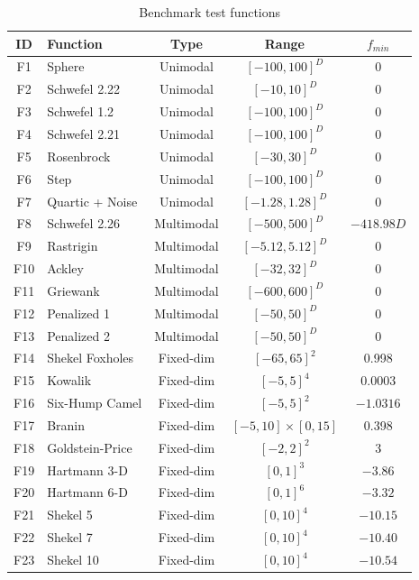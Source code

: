 \documentclass[preprint,12pt]{elsarticle}
\begin{document}
\begin{table}[htbp]
\centering
\caption{Benchmark test functions}
\label{tab:benchmarks}
\footnotesize
\begin{tabular}{clccc}
\toprule
\textbf{ID} & \textbf{Function} & \textbf{Type} & \textbf{Range} & \textbf{$f_{min}$} \\
\midrule
F1 & Sphere & Unimodal & $[-100, 100]^D$ & 0 \\
F2 & Schwefel 2.22 & Unimodal & $[-10, 10]^D$ & 0 \\
F3 & Schwefel 1.2 & Unimodal & $[-100, 100]^D$ & 0 \\
F4 & Schwefel 2.21 & Unimodal & $[-100, 100]^D$ & 0 \\
F5 & Rosenbrock & Unimodal & $[-30, 30]^D$ & 0 \\
F6 & Step & Unimodal & $[-100, 100]^D$ & 0 \\
F7 & Quartic + Noise & Unimodal & $[-1.28, 1.28]^D$ & 0 \\
\midrule
F8 & Schwefel 2.26 & Multimodal & $[-500, 500]^D$ & $-418.98D$ \\
F9 & Rastrigin & Multimodal & $[-5.12, 5.12]^D$ & 0 \\
F10 & Ackley & Multimodal & $[-32, 32]^D$ & 0 \\
F11 & Griewank & Multimodal & $[-600, 600]^D$ & 0 \\
F12 & Penalized 1 & Multimodal & $[-50, 50]^D$ & 0 \\
F13 & Penalized 2 & Multimodal & $[-50, 50]^D$ & 0 \\
\midrule
F14 & Shekel Foxholes & Fixed-dim & $[-65, 65]^2$ & 0.998 \\
F15 & Kowalik & Fixed-dim & $[-5, 5]^4$ & 0.0003 \\
F16 & Six-Hump Camel & Fixed-dim & $[-5, 5]^2$ & $-1.0316$ \\
F17 & Branin & Fixed-dim & $[-5, 10] \times [0, 15]$ & 0.398 \\
F18 & Goldstein-Price & Fixed-dim & $[-2, 2]^2$ & 3 \\
F19 & Hartmann 3-D & Fixed-dim & $[0, 1]^3$ & $-3.86$ \\
F20 & Hartmann 6-D & Fixed-dim & $[0, 1]^6$ & $-3.32$ \\
F21 & Shekel 5 & Fixed-dim & $[0, 10]^4$ & $-10.15$ \\
F22 & Shekel 7 & Fixed-dim & $[0, 10]^4$ & $-10.40$ \\
F23 & Shekel 10 & Fixed-dim & $[0, 10]^4$ & $-10.54$ \\
\bottomrule
\end{tabular}
\end{table}
\end{document}
